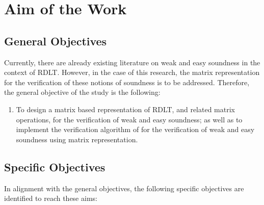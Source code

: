 

\section{Aim of the Work}
\subsection*{General Objectives}
Currently, there are already existing literature on weak and easy soundness in the context of RDLT. However, in the case of this research, the matrix representation for the verification of these notions of soundness is to be addressed. Therefore, the general objective of the study is the following:

\begin{enumerate}
    \item To design a matrix based representation of RDLT, and related matrix operations, for the verification of weak and easy soundness; as well as to implement the verification algorithm of \cite{Ramirez2024} for the verification of weak and easy soundness using matrix representation.
\end{enumerate}

\subsection*{Specific Objectives}
In alignment with the general objectives, the following specific objectives are identified to reach these aims:
